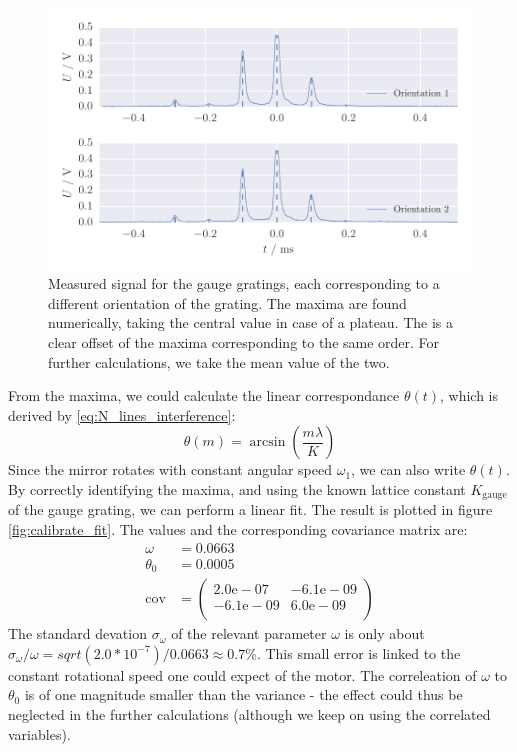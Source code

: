\begin{figure}[htpb]
    \centering
    \includegraphics[width=1.0\linewidth]{figures/calibrate_peaks}
    \caption{
        Measured signal for the gauge gratings, each corresponding to a different orientation of the 
        grating. The maxima are found numerically, taking the central value in case of a plateau. 
        The is a clear offset of the maxima corresponding to the same order. For further calculations, 
        we take the mean value of the two. 
        }
     \label{fig:calibrate_peaks}
\end{figure}

From the maxima, we could calculate the linear correspondance $\theta(t)$, 
which is derived by \ref{eq:N_lines_interference}:
\begin{equation}
    \theta(m) = \arcsin\left(\frac{m \lambda}{K}\right)
\end{equation}
Since the mirror rotates with constant angular speed $\omega_1$, we can 
also write $\theta(t)$. By correctly identifying the maxima, and using the 
known lattice constant $K_\mathrm{gauge}$ of the gauge grating, we can perform a linear fit.
The result is plotted in figure \ref{fig:calibrate_fit}. The values and the corresponding 
covariance matrix are: 
\begin{align}
	\omega &= 0.0663 \\
	\theta_0 &= 0.0005 \\
	\mathrm{cov} &=
	\begin{pmatrix}
		2.0\mathrm{e}-07 &-6.1\mathrm{e}-09 \\
		-6.1\mathrm{e}-09 &6.0\mathrm{e}-09 \\
	\end{pmatrix} 
\end{align}
The standard devation $\sigma_\omega$ of the relevant parameter $\omega$ is only about 
$\sigma_\omega / \omega = sqrt(2.0 * 10^{-7}) / 0.0663 \approx 0.7 \%$. 
This small error is linked to the constant rotational speed 
one could expect of the motor. The correleation of $\omega$ to $\theta_0$ is of one magnitude smaller 
than the variance - the effect could thus be neglected in the further calculations (although we keep 
    on using the correlated variables).

